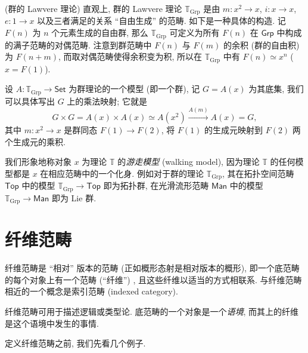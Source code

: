 \begin{example}
	{(群的 Lawvere 理论)}
	直观上, 群的 Lawvere 理论 $\mathbb T_{\text{Grp}}$ 是由 $m\colon x^2\to x$, $i\colon x\to x$, $e\colon 1\to x$ 以及三者满足的关系 ``自由生成'' 的范畴. 如下是一种具体的构造. 记 $F(n)$ 为 $n$ 个元素生成的自由群,
	那么 $\mathbb T_{\text{Grp}}$ 可定义为所有 $F(n)$ 在 $\mathsf {Grp}$ 中构成的满子范畴的对偶范畴. 注意到群范畴中 $F(n)$ 与 $F(m)$ 的余积 (群的自由积) 为 $F(n+m)$,
	而取对偶范畴使得余积变为积, 所以在 $\mathbb T_{\text{Grp}}$ 中有 $F(n) \simeq x^n$ ($x=F(1)$).
	
	设 $A \colon \mathbb T_{\text{Grp}} \to \mathsf {Set}$ 为群理论的一个模型 (即一个群), 记 $G=A(x)$ 为其底集, 我们可以具体写出 $G$ 上的乘法映射;
	它就是
	$$
	G\times G = A(x) \times A(x) \simeq A(x^2) \overset{A(m)}{\longrightarrow} A(x) = G,
	$$
	其中 $m \colon x^2 \to x$ 是群同态 $F(1) \to F(2)$, 将 $F(1)$ 的生成元映射到 $F(2)$ 两个生成元的乘积.
\end{example}

我们形象地称对象 $x$ 为理论 $\mathbb T$ 的\emph{游走模型} (walking model), 因为理论 $\mathbb T$ 的任何模型都是 $x$ 在相应范畴中的一个化身.
例如对于群的理论 $\mathbb T_{\text{Grp}}$, 其在拓扑空间范畴 $\mathsf {Top}$ 中的模型 $\mathbb T_{\text{Grp}} \to \mathsf {Top}$ 即为拓扑群,
在光滑流形范畴 $\mathsf {Man}$ 中的模型 $\mathbb T_{\text{Grp}} \to \mathsf {Man}$ 即为 Lie 群.

\section{纤维范畴}

纤维范畴是 ``相对'' 版本的范畴 (正如概形态射是相对版本的概形), 即一个底范畴的每个对象上有一个范畴 (``纤维'') , 且这些纤维以适当的方式相联系.
与纤维范畴相近的一个概念是索引范畴 (indexed category).

纤维范畴可用于描述逻辑或类型论. 底范畴的一个对象是一个\emph{语境}, 而其上的纤维是这个语境中发生的事情.

定义纤维范畴之前, 我们先看几个例子.

